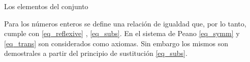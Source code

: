 
Los elementos del conjunto 



Para los números enteros se define una relación de igualdad que, por lo tanto, cumple con \cref{eq_reflexive} , \cref{eq_subs}. En el sistema de Peano \cref{eq_symm} y \cref{eq_trans} son considerados como axiomas. Sin embargo los mismos son demostrales a partir del principio de sustitución \cref{eq_subs}.






